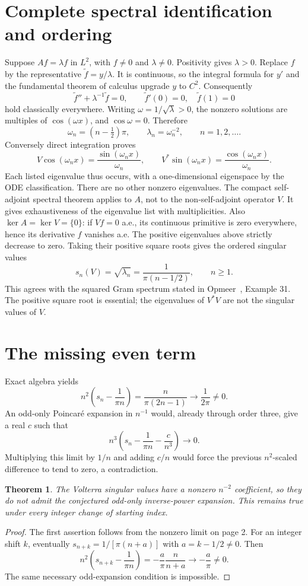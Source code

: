 \documentclass[11pt]{article}
\newtheorem{theorem}{Theorem}
\begin{document}
\section*{Complete spectral identification and ordering}
Suppose $Af=\lambda f$ in $L^2$, with $f\ne0$ and
$\lambda\ne0$. Positivity gives $\lambda>0$. Replace $f$ by
the representative $\widetilde f=y/\lambda$. It is continuous,
so the integral formula for $y'$ and the fundamental theorem
of calculus upgrade $y$ to $C^2$. Consequently
\[
 \widetilde f''+\lambda^{-1}\widetilde f=0,
 \qquad \widetilde f'(0)=0,\quad \widetilde f(1)=0
\]
hold classically everywhere. Writing $\omega=1/\sqrt\lambda>0$,
the nonzero solutions are multiples of $\cos(\omega x)$, and
$\cos\omega=0$. Therefore
\[
 \omega_n=(n-\tfrac12)\pi,\qquad
 \lambda_n=\omega_n^{-2},\qquad n=1,2,\ldots .
\]
Conversely direct integration proves
\[
 V\cos(\omega_n x)=\frac{\sin(\omega_n x)}{\omega_n},\qquad
 V^*\sin(\omega_n x)=\frac{\cos(\omega_n x)}{\omega_n}.
\]
Each listed eigenvalue thus occurs, with a one-dimensional
eigenspace by the ODE classification. There are no other nonzero
eigenvalues. The compact self-adjoint spectral theorem applies
to $A$, not to the non-self-adjoint operator $V$. It gives
exhaustiveness of the eigenvalue list with multiplicities.
Also $\ker A=\ker V=\{0\}$: if $Vf=0$ a.e., its continuous
primitive is zero everywhere, hence its derivative $f$ vanishes
a.e. The positive eigenvalues above strictly decrease to zero.
Taking their positive square roots gives the ordered singular values
\[
 s_n(V)=\sqrt{\lambda_n}=
 \frac1{\pi(n-1/2)},\qquad n\geq1.
\]
This agrees with the squared Gram spectrum stated in
Opmeer~\cite{Opmeer}, Example 31. The positive square root is
essential; the eigenvalues of $V^*V$ are not the singular values of $V$.

\section*{The missing even term}
Exact algebra yields
\[
 n^2\left(s_n-\frac1{\pi n}\right)
 =\frac{n}{\pi(2n-1)}\longrightarrow\frac1{2\pi}\ne0.
\]
An odd-only Poincar\'e expansion in $n^{-1}$ would, already
through order three, give a real $c$ such that
\[
 n^3\left(s_n-\frac1{\pi n}-\frac c{n^3}\right)\longrightarrow0.
\]
Multiplying this limit by $1/n$ and adding $c/n$ would force
the previous $n^2$-scaled difference to tend to zero, a contradiction.

\newpage
\begin{theorem}
The Volterra singular values have a nonzero $n^{-2}$ coefficient,
so they do not admit the conjectured odd-only inverse-power
expansion. This remains true under every integer change of starting index.
\end{theorem}
\begin{proof}
The first assertion follows from the nonzero limit on page 2.
For an integer shift $k$, eventually
$s_{n+k}=1/[\pi(n+a)]$ with $a=k-1/2\ne0$. Then
\[
 n^2\left(s_{n+k}-\frac1{\pi n}\right)
 =-\frac a\pi\frac n{n+a}\longrightarrow-\frac a\pi\ne0.
\]
The same necessary odd-expansion condition is impossible.
\end{proof}
\end{document}
